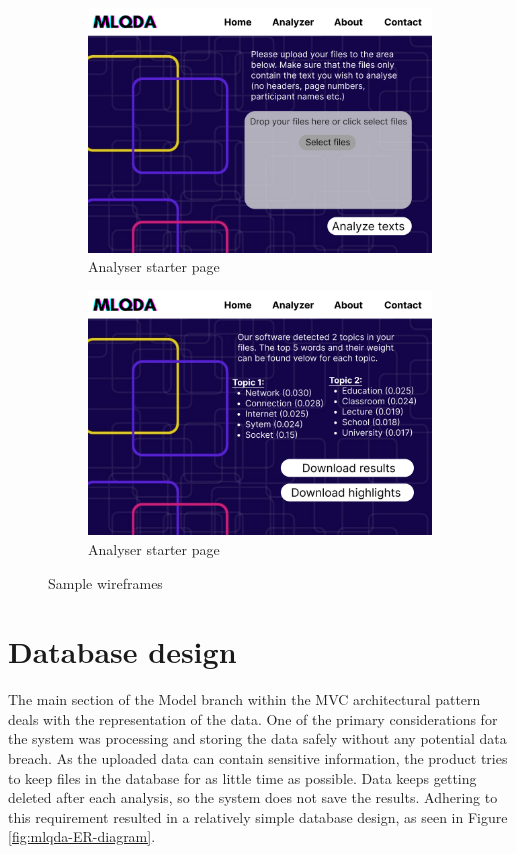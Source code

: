\documentclass{l4proj}
\begin{document}
\begin{figure}[H]
\centering
\begin{subfigure}{.5\textwidth}
    \centering
    \includegraphics[width=0.95\linewidth]{images/Analyzer (start).png}
    \caption{Analyser starter page}
    \label{fig:mlqda-analyser-start-diagram} 
\end{subfigure}%
\begin{subfigure}{.5\textwidth}
    \centering
    \includegraphics[width=0.95\linewidth]{images/Analyzer (results).png}
    \caption{Analyser starter page}
    \label{fig:mlqda-analyser-results-diagram} 
\end{subfigure}
\caption{Sample wireframes}
\label{fig:wireframes}
\end{figure}

\section{Database design}
The main section of the Model branch within the MVC architectural pattern deals with the representation of the data. One of the primary considerations for the system was processing and storing the data safely without any potential data breach. As the uploaded data can contain sensitive information, the product tries to keep files in the database for as little time as possible. Data keeps getting deleted after each analysis, so the system does not save the results. Adhering to this requirement resulted in a relatively simple database design, as seen in Figure \ref{fig:mlqda-ER-diagram}.
\end{document}
